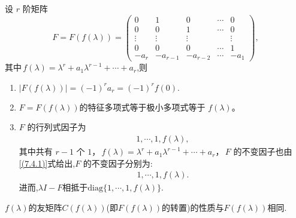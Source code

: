 \documentclass[../../main.tex]{subfiles}
\begin{document}
\begin{lemma}[Frobenius块的基本性质]\label{lemma:Frobenius标准型矩阵的极小多项式和不变因子}
设 $r$ 阶矩阵
\[
F=F(f(\lambda)) = \begin{pmatrix}
0 & 1 & 0 & \cdots & 0 \\
0 & 0 & 1 & \cdots & 0 \\
\vdots & \vdots & \vdots & & \vdots \\
0 & 0 & 0 & \cdots & 1 \\
-a_r & -a_{r - 1} & -a_{r - 2} & \cdots & -a_1
\end{pmatrix},
\]
其中$\,f(\lambda)=\lambda^r + a_1\lambda^{r - 1}+\cdots + a_r$,则
\begin{enumerate}[(1)]
\item $|F(f(\lambda))|=(-1)^{r}a_r=(-1)^{r}f(0).$

\item $F=F(f(\lambda))$的特征多项式等于极小多项式等于 $f(\lambda)$。

\item $F$ 的行列式因子为
\begin{align}
1,\cdots,1,f(\lambda),\label{(7.4.1)}
\end{align}
其中共有 $r - 1$ 个 $1$，$\,f(\lambda)=\lambda^r + a_1\lambda^{r - 1}+\cdots + a_r$，$\,F$ 的不变因子也由\eqref{(7.4.1)}式给出,$F$ 的不变因子分别为:
\begin{align*}
1,\cdots,1,f(\lambda).
\end{align*}
进而,$\lambda I-F$相抵于$\mathrm{diag}\{1,\cdots,1,f(\lambda)\}.$
\end{enumerate}
\end{lemma}
\begin{remark}
$f(\lambda)$的友矩阵$C(f(\lambda))$(即$F(f(\lambda))$的转置)的性质与$F(f(\lambda))$相同.
\end{remark}
\end{document}
